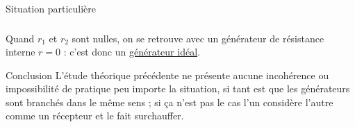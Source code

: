 \documentclass[../main/main.tex]{subfiles}
\begin{document}
\begin{tcbraster}[raster columns=2, raster equal height=rows]
    \begin{NCcoro}{Situation particulière}
        \subsubsection{}
        Quand $r_1$ et $r_2$ sont nulles, on se retrouve avec un générateur de
        résistance interne $r = 0$ : c'est donc un \underline{générateur idéal}.
    \end{NCcoro}
    \begin{NCimpo}{Conclusion}
        L'étude théorique précédente ne présente aucune incohérence ou
        impossibilité de pratique peu importe la situation, si tant est que les
        générateurs sont branchés dans le même sens ; si ça n'est pas le cas
        l'un considère l'autre comme un récepteur et le fait surchauffer.
    \end{NCimpo}
\end{tcbraster}
\end{document}
